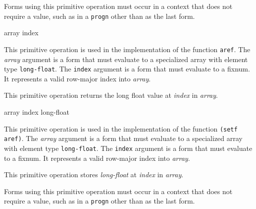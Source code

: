 Forms using this primitive operation must occur in a context that does
not require a value, such as in a \texttt{progn} other than as the
last form.

 {array index}

This primitive operation is used in the implementation of the
\commonlisp{} function \texttt{aref}.  The \textit{array} argument is
a form that must evaluate to a specialized array with element type
\texttt{long-float}.  The \texttt{index} argument is a form that must
evaluate to a fixnum.  It represents a valid row-major index into
\textit{array}.

This primitive operation returns the long float value at
\textit{index} in \textit{array}.

 {array index long-float}

This primitive operation is used in the implementation of the
\commonlisp{} function \texttt{(setf aref)}.  The \textit{array}
argument is a form that must evaluate to a specialized array with
element type \texttt{long-float}.  The \texttt{index} argument is a
form that must evaluate to a fixnum.  It represents a valid row-major
index into \textit{array}.

This primitive operation stores \textit{long-float} at \textit{index}
in \textit{array}.

Forms using this primitive operation must occur in a context that does
not require a value, such as in a \texttt{progn} other than as the
last form.

